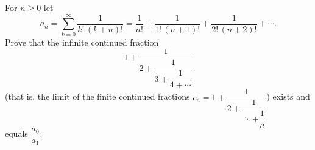 For $n\ge0$ let
\[a_n=\sum_{k=0}^{\infty}\dfrac{1}{k!\,(k+n)!}=\dfrac{1}{n!}+\dfrac{1}{1!\,(n+1)!}+\dfrac{1}{2!\,(n+2)!}+\cdots.\]
Prove that the infinite continued fraction
\[1+\dfrac{1}{2+\dfrac{1}{3+\dfrac{1}{4+\cdots}}}\]
(that is, the limit of the finite continued fractions $c_n=1+\dfrac{1}{2+\dfrac{1}{\ddots+\dfrac{1}{n}}}$) exists and equals $\dfrac{a_0}{a_1}$.

